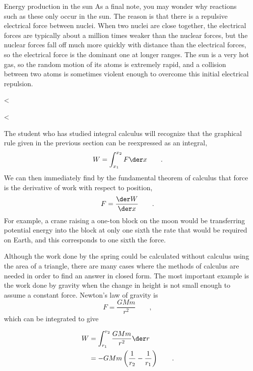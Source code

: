 \begin{eg}{Energy production in the sun}
As a final note, you may wonder why reactions such as these
only occur in the sun. The reason is that there is a
repulsive electrical force between nuclei. When two nuclei
are close together, the electrical forces are typically
about a million times weaker than the nuclear forces, but
the nuclear forces fall off much more quickly with distance
than the electrical forces, so the electrical force is the
dominant one at longer ranges. The sun is a very hot gas, so
the random motion of its atoms is extremely rapid, and a
collision between two atoms is sometimes violent enough to
overcome this initial electrical repulsion.
\end{eg}

<%

<%

The student who has studied integral calculus will recognize
that the graphical rule given in the previous section can be
reexpressed as an integral,
\begin{equation*}
 W = \int_{x_1}^{x_2}F \der x \qquad .
\end{equation*}
We can then immediately find by the fundamental theorem of
calculus that force is the derivative of work with
respect to position,
\begin{equation*}
 F = \frac{\der W}{\der x}\qquad .
\end{equation*}
For example, a crane raising a one-ton block on the moon
would be transferring potential energy into the block at
only one sixth the rate that would be required on Earth, and
this corresponds to one sixth the force.

Although the work done by the spring could be calculated
without calculus using the area of a triangle, there are
many cases where the methods of calculus are needed in order
to find an answer in closed form. The most important example
is the work done by gravity when the change in height is not
small enough to assume a constant force. Newton's law of gravity is
\begin{equation*}
 F = \frac{GMm}{r^2} \qquad ,
\end{equation*}
which can be integrated to give

\begin{align*}
 W &= \int_{r_1}^{r_2} \frac{GMm}{r^2} \der r\\
 &= -GMm\left(\frac{1}{r_2}-\frac{1}{r_1}\right)\qquad .
\end{align*}


